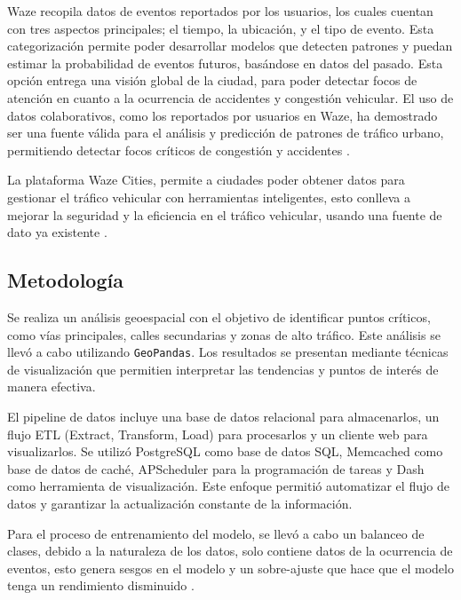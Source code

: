 \documentclass[12pt]{article}
\begin{document}
Waze recopila datos de eventos reportados por los usuarios, los cuales cuentan con tres aspectos principales; el tiempo, la ubicación, y el tipo de evento. Esta categorización permite poder desarrollar modelos que detecten patrones y puedan estimar la probabilidad de eventos futuros, basándose en datos del pasado. Esta opción entrega una visión global de la ciudad, para poder detectar focos de atención en cuanto a la ocurrencia de accidentes y congestión vehicular. El uso de datos colaborativos, como los reportados por usuarios en Waze, ha demostrado ser una fuente válida para el análisis y predicción de patrones de tráfico urbano, permitiendo detectar focos críticos de congestión y accidentes \parencite{ferreira2017waze}.

La plataforma Waze Cities, permite a ciudades poder obtener datos para gestionar el tráfico vehicular con herramientas inteligentes, esto conlleva a mejorar la seguridad y la eficiencia en el tráfico vehicular, usando una fuente de dato ya existente \parencite{wazecitiescasestudies2024}.

\subsection{Metodología}

Se realiza un análisis geoespacial con el objetivo de identificar puntos críticos, como vías principales, calles secundarias y zonas de alto tráfico. Este análisis se llevó a cabo utilizando \texttt{GeoPandas}. Los resultados se presentan mediante técnicas de visualización que permitien interpretar las tendencias y puntos de interés de manera efectiva.

El pipeline de datos incluye una base de datos relacional para almacenarlos, un flujo ETL (Extract, Transform, Load) para procesarlos y un cliente web para visualizarlos. Se utilizó PostgreSQL \parencite{postgres2025} como base de datos SQL, Memcached  \parencite{memcached2025} como base de datos de caché, APScheduler para la programación de tareas y Dash \parencite{dash2025} como herramienta de visualización. Este enfoque permitió automatizar el flujo de datos y garantizar la actualización constante de la información.

Para el proceso de entrenamiento del modelo, se llevó a cabo un balanceo de clases, debido a la naturaleza de los datos, solo contiene datos de la ocurrencia de eventos, esto genera sesgos en el modelo y un sobre-ajuste que hace que el modelo tenga un rendimiento disminuido \parencite{he2009learning}.
\end{document}

